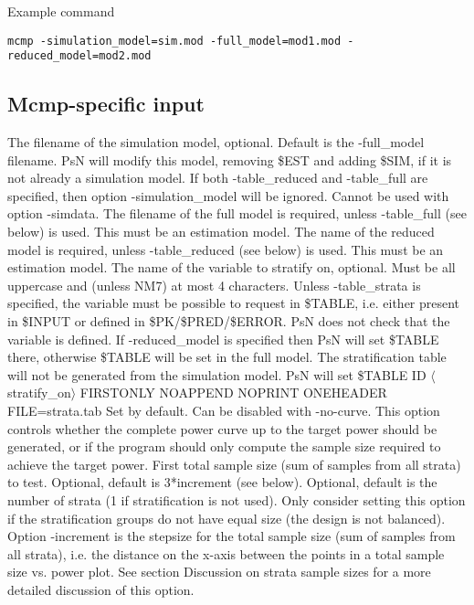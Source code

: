 \noindent Example command
\begin{verbatim}
mcmp -simulation_model=sim.mod -full_model=mod1.mod -reduced_model=mod2.mod 
\end{verbatim}

\subsection{Mcmp-specific input}
\begin{optionlist}
The filename of the simulation model, optional. 
Default is the -full\_model filename. PsN will modify this model, removing \$EST and adding \$SIM, if it is not already a simulation model.
If both -table\_reduced and -table\_full are specified, then option -simulation\_model will be ignored. Cannot be used with option -simdata.
\nextopt
{}
The filename of the full model is required, unless -table\_full (see below) is used. This must be an estimation model.
\nextopt
{}
The name of the reduced model is required, unless -table\_reduced (see below) is used. This must be an estimation model.
\nextopt
{}
The name of the variable to stratify on, optional. Must be all uppercase and (unless NM7) at most 4 characters. 
Unless -table\_strata is specified, the variable must be possible to request in \$TABLE, i.e. either present in \$INPUT or defined in \$PK/\$PRED/\$ERROR. PsN does not check that the variable is defined. If -reduced\_model is specified then PsN will set \$TABLE there, otherwise \$TABLE will be set in the full model. The stratification table will not be generated from the simulation model. PsN will set \$TABLE ID $\langle$stratify\_on$\rangle$ FIRSTONLY NOAPPEND NOPRINT ONEHEADER FILE=strata.tab 
\nextopt
{}
Set by default. Can be disabled with -no-curve. This option controls whether the complete power curve up to the target power should be generated, or if the program should only compute the sample size required to achieve the target power. 
\nextopt
{}
First total sample size (sum of samples from all strata) to test. Optional, default is 3*increment (see below). 
\nextopt
{}
Optional, default is the number of strata (1 if stratification is not used). Only consider setting this option if the stratification groups do not have equal size (the design is not balanced). Option -increment is the stepsize for the total sample size (sum of samples from all strata), i.e. the distance on the x-axis between the points in a total sample size vs. power plot. See section Discussion on strata sample sizes for a more detailed discussion of this option. 

\end{optionlist}
